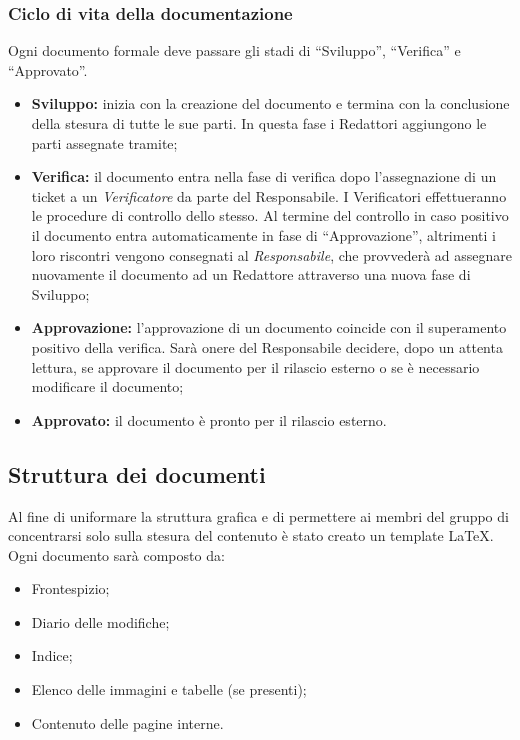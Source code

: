 \subsubsection{Ciclo di vita della documentazione}
Ogni documento formale deve passare gli stadi di ``Sviluppo”, ``Verifica” e ``Approvato”.
\begin{itemize}
	\item \textbf{Sviluppo:} inizia con la creazione del documento e termina con la conclusione	della stesura di tutte le sue parti. In questa fase i Redattori aggiungono le parti assegnate tramite;
	
	\item  \textbf{Verifica:} il documento entra nella fase di verifica dopo l’assegnazione di un ticket a un \textit{Verificatore} da
	parte del Responsabile. I Verificatori effettueranno le procedure di controllo
	dello stesso.
	Al termine del controllo in caso positivo il documento entra automaticamente
	in fase di ``Approvazione”, altrimenti i loro riscontri vengono consegnati
	al \textit{Responsabile}, che provvederà ad assegnare nuovamente il
	documento ad un Redattore attraverso una nuova fase di Sviluppo;
	
	\item  \textbf{Approvazione:} l’approvazione di un documento coincide con il superamento
	positivo della verifica.
	Sarà onere del Responsabile decidere, dopo un attenta lettura, se approvare il documento per il rilascio esterno o se è necessario modificare il documento;

	
	\item  \textbf{Approvato:} il documento è pronto per il rilascio esterno.
\end{itemize}


\subsection{Struttura dei documenti}
Al fine di uniformare la struttura grafica e di permettere ai membri del gruppo di concentrarsi solo sulla stesura del contenuto è stato creato un template \LaTeX.
Ogni documento sarà composto da:
\begin{itemize}
	\item Frontespizio;
	\item Diario delle modifiche;
	\item Indice;
	\item Elenco delle immagini e tabelle (se presenti);
	\item Contenuto delle pagine interne.
\end{itemize}
